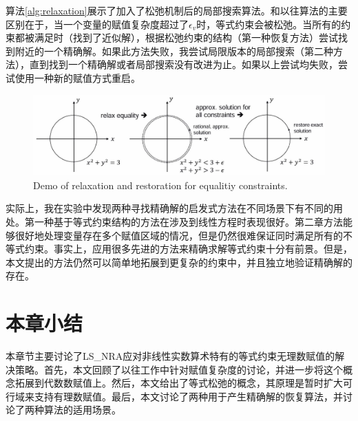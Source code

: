 算法\ref{alg:relaxation}展示了加入了松弛机制后的局部搜索算法。和以往算法的主要区别在于，当一个变量的赋值复杂度超过了$\epsilon_v$时，等式约束会被松弛。当所有的约束都被满足时（找到了近似解），根据松弛约束的结构（第一种恢复方法）尝试找到附近的一个精确解。如果此方法失败，我尝试局限版本的局部搜索（第二种方法），直到找到一个精确解或者局部搜索没有改进为止。如果以上尝试均失败，尝试使用一种新的赋值方式重启。

\begin{figure}[t]
    \centering
    \includegraphics[width=\columnwidth]{Img/relax.jpg}
     {Demo of relaxation and restoration for equalitiy constraints.}
\label{fig:relaxation}
\end{figure}

实际上，我在实验中发现两种寻找精确解的启发式方法在不同场景下有不同的用处。第一种基于等式约束结构的方法在涉及到线性方程时表现很好。第二章方法能够很好地处理变量存在多个赋值区域的情况，但是仍然很难保证同时满足所有的不等式约束。事实上，应用很多先进的方法来精确求解等式约束十分有前景\cite{CimattiGLS22, LiXZ23b}。但是，本文提出的方法仍然可以简单地拓展到更复杂的约束中，并且独立地验证精确解的存在。

\section{本章小结}
本章节主要讨论了LS\_NRA应对非线性实数算术特有的等式约束无理数赋值的解决策略。首先，本文回顾了以往工作中针对赋值复杂度的讨论，并进一步将这个概念拓展到代数数赋值上。然后，本文给出了等式松弛的概念，其原理是暂时扩大可行域来支持有理数赋值。最后，本文讨论了两种用于产生精确解的恢复算法，并讨论了两种算法的适用场景。

